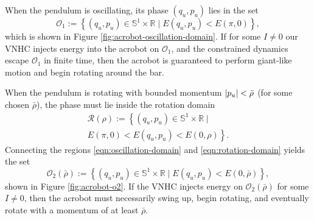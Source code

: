 \documentclass[journal,twoside,web]{ieeecolor}
\DeclarePairedDelimiter{\abs}{\lvert}{\rvert}
\newcommand*{\R}{\mathbb{R}}
\newcommand*{\Sone}{\mathbb{S}^1}
\newcommand*{\SxR}{\Sone \times \R}
\begin{document}
When the pendulum is oscillating, its phase \((q_u,p_u)\) lies in the set
\begin{equation}\label{eqn:oscillation-domain}
    \mathcal{O}_1 := \left\{(q_u,p_u) \in \SxR 
    \mid E(q_u,p_u) < E(\pi,0) \right\}
    ,
\end{equation}
which is shown in Figure \ref{fig:acrobot-oscillation-domain}.
If for some \(I \neq 0\) our VNHC injects energy into the acrobot on 
\(\mathcal{O}_1\), and the constrained dynamics escape
\(\mathcal{O}_1\) in finite time, then the acrobot is guaranteed to perform
giant-like motion and begin rotating around the bar.

When the pendulum is rotating with bounded momentum
\(\abs{p_u} < \bar{\rho}\) (for some chosen \(\bar{\rho}\)),
the phase must lie inside the rotation domain
\begin{multline}\label{eqn:rotation-domain}
    \mathcal{R}(\rho) := \left\{
        (q_u,p_u) \in \SxR \mid\right.
        \\
        \left.E(\pi,0) < E(q_u,p_u) < E(0,\rho)
    \right\}
    .
\end{multline}
Connecting the regions \eqref{eqn:oscillation-domain} and
\eqref{eqn:rotation-domain} yields the set
\begin{equation}\label{eqn:o-rhobar}
    \mathcal{O}_2(\bar{\rho}) := \left\{(q_u,p_u) \in \SxR
        \mid E(q_u,p_u) < E(0,\bar{\rho}) \right\}
    ,
\end{equation}
shown in Figure \ref{fig:acrobot-o2}.
If the VNHC injects energy on \(\mathcal{O}_2(\bar{\rho})\) for some 
\(I \neq 0\), then the acrobot must necessarily swing up, begin rotating, 
and eventually rotate with a momentum of at least \(\bar{\rho}\).
\end{document}

